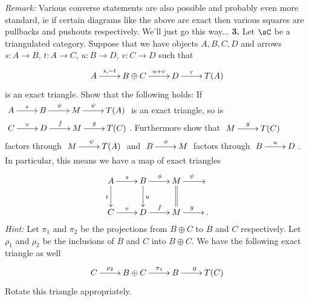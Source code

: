 \documentclass[12pt]{amsart}
\numberwithin{equation}{theorem}
\renewcommand{\:}{\colon}
\theoremstyle{theorem}
\begin{document}
\vfill
\emph{Remark:}  Various converse statements are also possible and probably even more standard, ie if certain diagrams like the above are exact then various squares are pullbacks and pushouts respectively.  We'll just go this way...
\newpage
\noindent
{\bf 3.}  Let $\sC$ be a triangulated category.  Suppose that we have objects $A, B, C, D$ and arrows $s : A \rightarrow B$, $t : A \rightarrow C$, $u : B \rightarrow D$, $v : C \rightarrow D$ such that
\[
\xymatrix{
A \ar[r]^-{s, -t} & B \oplus C \ar[r]^-{u + v} & D \ar[r]^-r & T(A) \\
}
\]
is an exact triangle.  Show that the following holds:
If $\xymatrix{A \ar[r]^s & B \ar[r]^\phi & M \ar[r]^-{\psi} & T(A) }$ is an exact triangle, so is $\xymatrix{C \ar[r]^{v} & D \ar[r]^f & M \ar[r]^-g & T(C) }$.  Furthermore show that $\xymatrix{M \ar[r]^-g & T(C)}$ factors through $\xymatrix{M \ar[r]^{\psi} & T(A)}$ and $\xymatrix{B \ar[r]^-{\phi} & M}$ factors through $\xymatrix{B \ar[r]^-{u} & D}$.  In particular, this means we have a map of exact triangles
\[
\xymatrix{
A \ar[d]_t \ar[r]^s & B \ar[r]^\phi \ar[d]^u & M \ar[r]^{\psi} \ar@{=}[d]  & \\
C \ar[r]^{v} & D \ar[r]^f & M \ar[r]^{g} & .\\
}
\]
\vskip 6pt
\emph{Hint:} Let $\pi_1$ and $\pi_2$ be the projections from $B \oplus C$ to $B$ and $C$ respectively.  Let $\rho_1$ and $\rho_2$ be the inclusions of $B$ and $C$ into $B \oplus C$.  We have the following exact triangle as well
\[
\xymatrix{C \ar[r]^-{\rho_2} & B \oplus C \ar[r]^-{\pi_1} & B \ar[r]^0 & T(C)}
\]
Rotate this triangle appropriately.
\end{document}

